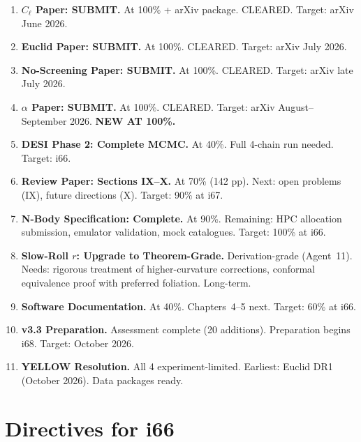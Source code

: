 \documentclass[11pt,a4paper]{article}
\begin{document}
\begin{enumerate}[label=\textbf{P\arabic*.}]
\item \textbf{$C_\ell$ Paper: SUBMIT.} At 100\% + arXiv package. CLEARED. Target: arXiv June 2026.

\item \textbf{Euclid Paper: SUBMIT.} At 100\%. CLEARED. Target: arXiv July 2026.

\item \textbf{No-Screening Paper: SUBMIT.} At 100\%. CLEARED. Target: arXiv late July 2026.

\item \textbf{$\alpha$ Paper: SUBMIT.} At 100\%. CLEARED. Target: arXiv August--September 2026. \textbf{NEW AT 100\%.}

\item \textbf{DESI Phase 2: Complete MCMC.} At 40\%. Full 4-chain run needed. Target: i66.

\item \textbf{Review Paper: Sections IX--X.} At 70\% (142 pp). Next: open problems (IX), future directions (X). Target: 90\% at i67.

\item \textbf{N-Body Specification: Complete.} At 90\%. Remaining: HPC allocation submission, emulator validation, mock catalogues. Target: 100\% at i66.

\item \textbf{Slow-Roll $r$: Upgrade to Theorem-Grade.} Derivation-grade (Agent~11). Needs: rigorous treatment of higher-curvature corrections, conformal equivalence proof with preferred foliation. Long-term.

\item \textbf{Software Documentation.} At 40\%. Chapters~4--5 next. Target: 60\% at i66.

\item \textbf{v3.3 Preparation.} Assessment complete (20 additions). Preparation begins i68. Target: October 2026.

\item \textbf{YELLOW Resolution.} All 4 experiment-limited. Earliest: Euclid DR1 (October 2026). Data packages ready.
\end{enumerate}


\section{Directives for i66}
\label{sec:directives}
\end{document}
